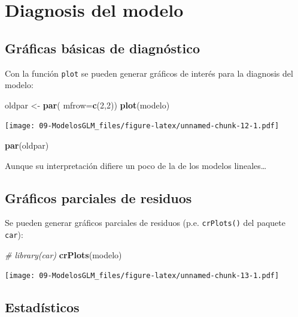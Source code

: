 \documentclass[]{book}
\newenvironment{Shaded}{\begin{snugshade}}{\end{snugshade}}
\newcommand{\KeywordTok}[1]{\textcolor[rgb]{0.13,0.29,0.53}{\textbf{#1}}}
\newcommand{\DataTypeTok}[1]{\textcolor[rgb]{0.13,0.29,0.53}{#1}}
\newcommand{\DecValTok}[1]{\textcolor[rgb]{0.00,0.00,0.81}{#1}}
\newcommand{\StringTok}[1]{\textcolor[rgb]{0.31,0.60,0.02}{#1}}
\newcommand{\CommentTok}[1]{\textcolor[rgb]{0.56,0.35,0.01}{\textit{#1}}}
\newcommand{\NormalTok}[1]{#1}
\begin{document}
\section{Diagnosis del modelo}\label{diagnosis-del-modelo-1}

\subsection{Gráficas básicas de
diagnóstico}\label{graficas-basicas-de-diagnostico-1}

Con la función \texttt{plot} se pueden generar gráficos de interés para
la diagnosis del modelo:

\begin{Shaded}
\begin{Highlighting}[]
\NormalTok{oldpar <-}\StringTok{ }\KeywordTok{par}\NormalTok{( }\DataTypeTok{mfrow=}\KeywordTok{c}\NormalTok{(}\DecValTok{2}\NormalTok{,}\DecValTok{2}\NormalTok{))}
\KeywordTok{plot}\NormalTok{(modelo)}
\end{Highlighting}
\end{Shaded}

\texttt{[image: 09-ModelosGLM\_files/figure-latex/unnamed-chunk-12-1.pdf]}

\begin{Shaded}
\begin{Highlighting}[]
\KeywordTok{par}\NormalTok{(oldpar)}
\end{Highlighting}
\end{Shaded}

Aunque su interpretación difiere un poco de la de los modelos
lineales\ldots{}

\subsection{Gráficos parciales de
residuos}\label{graficos-parciales-de-residuos-1}

Se pueden generar gráficos parciales de residuos (p.e.
\texttt{crPlots()} del paquete \texttt{car}):

\begin{Shaded}
\begin{Highlighting}[]
\CommentTok{# library(car)}
\KeywordTok{crPlots}\NormalTok{(modelo)}
\end{Highlighting}
\end{Shaded}

\texttt{[image: 09-ModelosGLM\_files/figure-latex/unnamed-chunk-13-1.pdf]}

\subsection{Estadísticos}\label{estadisticos-1}
\end{document}
